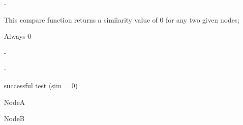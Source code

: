 
\precondition
-

\semantics
This compare function returns a similarity value of 0 for any two given nodes;

\returnvalue
Always 0

\parameters
-

\exceptions
-

\test	
	successful test (sim = 0)
  
	NodeA
	
	NodeB
	
	
